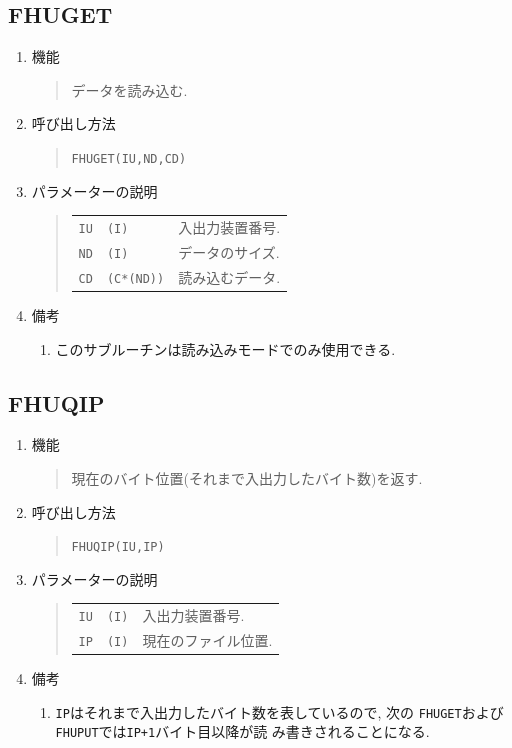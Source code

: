\subsection{FHUGET}
\begin{enumerate}
  \item 機能 
  \begin{quote}
   データを読み込む.
  \end{quote}
  \item 呼び出し方法 
  \begin{quote}
    {\tt FHUGET(IU,ND,CD)}
  \end{quote}
  \item パラメーターの説明 
  \begin{quote}
    \begin{tabular}{llp{10cm}}
      {\tt IU}   & {\tt (I)} & 入出力装置番号. \\
      {\tt ND}   & {\tt (I)} & データのサイズ.\\
      {\tt CD}   & {\tt (C*(ND))} & 読み込むデータ. 
    \end{tabular}
  \end{quote}
  \item 備考 
  \begin{enumerate}
    \item このサブルーチンは読み込みモードでのみ使用できる. 
  \end{enumerate}
\end{enumerate}

\subsection{FHUQIP}
\begin{enumerate}
  \item 機能 
  \begin{quote}
   現在のバイト位置(それまで入出力したバイト数)を返す. 
  \end{quote}
  \item 呼び出し方法 
  \begin{quote}
   {\tt FHUQIP(IU,IP)}
  \end{quote}
  \item パラメーターの説明 
  \begin{quote}
    \begin{tabular}{llp{10cm}}
      {\tt IU}   & {\tt (I)} & 入出力装置番号. \\
      {\tt IP}   & {\tt (I)} & 現在のファイル位置.
    \end{tabular}
  \end{quote}
  \item 備考 
  \begin{enumerate}
    \item {\tt IP}はそれまで入出力したバイト数を表しているので, 次の
          {\tt FHUGET}および{\tt FHUPUT}では{\tt IP+1}バイト目以降が読
          み書きされることになる.
  \end{enumerate}
\end{enumerate}

